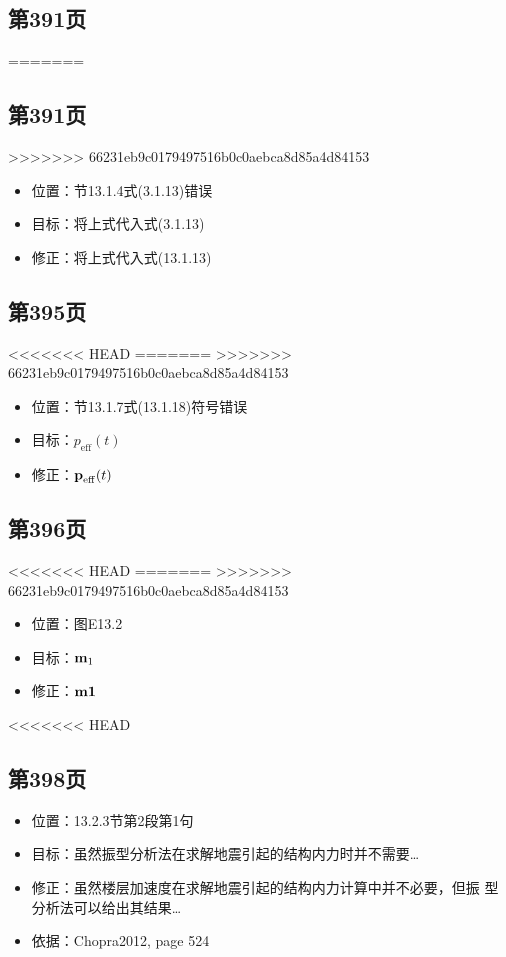 \documentclass[11pt]{article}
\begin{document}
\subsection*{第391页}
\label{sec:org1e8c721}
=======
\subsection*{第391页}
\label{sec:orgb0c60da}
>>>>>>> 66231eb9c0179497516b0c0aebca8d85a4d84153

\begin{itemize}
\item 位置：节13.1.4式(3.1.13)错误
\item 目标：将上式代入式(3.1.13)
\item 修正：将上式代入式(13.1.13)
\end{itemize}

\subsection*{第395页}
<<<<<<< HEAD
\label{sec:orgb2954d9}
=======
\label{sec:org11e0c0f}
>>>>>>> 66231eb9c0179497516b0c0aebca8d85a4d84153

\begin{itemize}
\item 位置：节13.1.7式(13.1.18)符号错误
\item 目标：\(p_{\mathrm{eff}}(t)\)
\item 修正：\(\bm{\mathrm{p}}_{\mathrm{eff}}(t)\)
\end{itemize}

\subsection*{第396页}
<<<<<<< HEAD
\label{sec:org69ba1d6}
=======
\label{sec:org455935e}
>>>>>>> 66231eb9c0179497516b0c0aebca8d85a4d84153

\begin{itemize}
\item 位置：图E13.2
\item 目标：\(\bm{\mathrm{m}}_{1}\)
\item 修正：\(\bm{\mathrm{m}} \textbf{1}\)
\end{itemize}
<<<<<<< HEAD

\subsection*{第398页}
\label{sec:org9bcfba9}

\begin{itemize}
\item 位置：13.2.3节第2段第1句
\item 目标：虽然振型分析法在求解地震引起的结构内力时并不需要\ldots{}
\item 修正：虽然楼层加速度在求解地震引起的结构内力计算中并不必要，但振
型分析法可以给出其结果\ldots{}
\item 依据：Chopra2012, page 524
\end{itemize}
\end{document}

